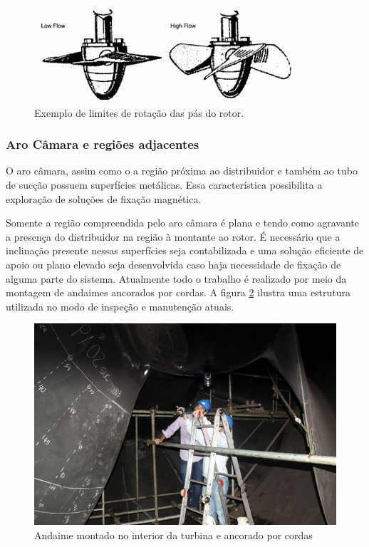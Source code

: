\begin{figure}[h!]	
	\includegraphics[width=\columnwidth]{sota/figs/intro/blades_angle}
	\caption{Exemplo de limites de rotação das pás do rotor.}
	\label{fig::blades_angle}
\end{figure}

\subsubsection{Aro Câmara e regiões adjacentes}

O aro câmara, assim como o a região próxima ao distribuidor e também ao tubo de
sucção possuem superfícies metálicas. Essa característica possibilita a
exploração de soluções de fixação magnética.

Somente a região compreendida pelo aro câmara é plana e tendo como agravante a presença do distribuidor na região à 
montante ao rotor. É necessário que a inclinação presente nessas superfícies seja contabilizada e uma solução eficiente 
de apoio ou plano elevado seja desenvolvida caso haja necessidade de fixação de alguma parte do sistema. Atualmente todo 
o trabalho é realizado por meio da montagem de andaimes ancorados por cordas. A
figura \ref{fig::andaime} ilustra uma estrutura utilizada no modo de inspeção e
manutenção atuais.

\begin{figure}[h!]	
	\includegraphics[width=\columnwidth]{sota/figs/viagem/img_4969}
	\caption{Andaime montado no interior da turbina e ancorado por cordas}
	\label{fig::andaime}
\end{figure}

